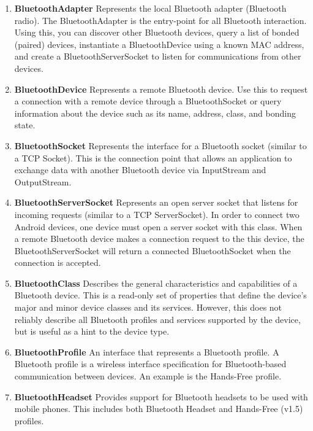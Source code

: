 \documentclass[11pt]{report}
\begin{document}
{{\begin{enumerate}
\item \textbf{BluetoothAdapter}\newline 
Represents the local Bluetooth adapter (Bluetooth radio). The BluetoothAdapter is the entry-point for all Bluetooth interaction. Using this, you can discover other Bluetooth devices, query a list of bonded (paired) devices, instantiate a BluetoothDevice using a known MAC address, and create a BluetoothServerSocket to listen for communications from other devices.
\item \textbf{BluetoothDevice}\newline 
Represents a remote Bluetooth device. Use this to request a connection with a remote device through a BluetoothSocket or query information about the device such as its name, address, class, and bonding state.
\item \textbf{BluetoothSocket}\newline 
Represents the interface for a Bluetooth socket (similar to a TCP Socket). This is the connection point that allows an application to exchange data with another Bluetooth device via InputStream and OutputStream.
\item \textbf{BluetoothServerSocket}\newline 
Represents an open server socket that listens for incoming requests (similar to a TCP ServerSocket). In order to connect two Android devices, one device must open a server socket with this class. When a remote Bluetooth device makes a connection request to the this device, the BluetoothServerSocket will return a connected BluetoothSocket when the connection is accepted.
\item \textbf{BluetoothClass}\newline 
Describes the general characteristics and capabilities of a Bluetooth device. This is a read-only set of properties that define the device's major and minor device classes and its services. However, this does not reliably describe all Bluetooth profiles and services supported by the device, but is useful as a hint to the device type.
\item \textbf{BluetoothProfile}\newline 
An interface that represents a Bluetooth profile. A Bluetooth profile is a wireless interface specification for Bluetooth-based communication between devices. An example is the Hands-Free profile. 
\item \textbf{BluetoothHeadset}\newline 
Provides support for Bluetooth headsets to be used with mobile phones. This includes both Bluetooth Headset and Hands-Free (v1.5) profiles.


\end{enumerate}}}
\end{document}
